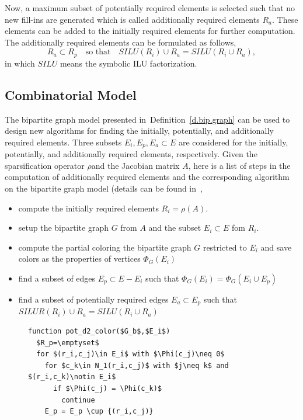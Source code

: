 \documentclass[12pt, oneside]{book}
\newcommand{\defref}[1]{Definition~\protect\ref{#1}}
\begin{document}
Now, a maximum subset of potentially required elements
is selected such that no new fill-ins are generated which is called
additionally required elements $R_a$. These elements can be added to the
initially required elements for further computation. 
The additionally required elements can be formulated as follows,
$$
R_a \subset R_p \quad\text{so that}\quad SILU(R_i) \cup R_a = SILU(R_i\cup R_a),
$$ 
in which $SILU$ means the symbolic ILU factorization.

\subsection{Combinatorial Model}
\label{ss.comb.precond}
The bipartite graph model presented in~\defref{d.bip.graph}
can be used to design new algorithms for finding the initially, potentially,
and additionally required elements. Three subsets $E_i, E_p, E_a\subset E$
are considered for the initially, potentially,
and additionally required elements, respectively.
Given the sparsification operator $\rho$and  the Jacobian matrix $A$,
here is a list of steps in the computation of additionally required elements
and the corresponding algorithm on the bipartite graph model
(details can be found in~\cite{Lulfesmann2012Fap},
\begin{itemize}
\item compute the initially required elements $R_i = \rho(A)$.
\item setup the bipartite graph $G$ from $A$ and the subset $E_i\subset E$ fom $R_i$.
\item compute the partial coloring the bipartite graph $G$ restricted to $E_i$ 
and save colors as the properties of vertices $\Phi_{G}(E_i)$
\item find a subset of edges $E_p\subset E - E_i$ such that $\Phi_{G}(E_i) = \Phi_{G}(E_i \cup E_p)$
\item find a subset of potentially required edges $E_a\subset E_p$ such 
that $SILUR(R_i) \cup R_a = SILU(R_i \cup R_a)$
\end{itemize}
\begin{figure}
\begin{lstlisting}[caption=Find potentially required elements for 
distance-$2$ coloring,label=code.pot.d2,mathescape]
function pot_d2_color($G_b$,$E_i$)
  $R_p=\emptyset$
  for $(r_i,c_j)\in E_i$ with $\Phi(c_j)\neq 0$
    for $c_k\in N_1(r_i,c_j)$ with $j\neq k$ and $(r_i,c_k)\notin E_i$
      if $\Phi(c_j) = \Phi(c_k)$
        continue
    E_p = E_p \cup {(r_i,c_j)}
\end{lstlisting}
\end{figure}
\end{document}
